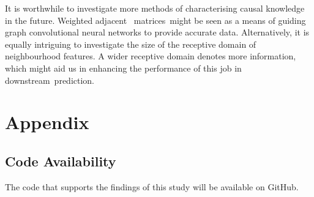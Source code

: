 \documentclass[sigconf,screen]{acmart}
\begin{document}
It is worthwhile to investigate more methods of characterising causal knowledge in the future. Weighted adjacent  matrices might be seen as a means of guiding graph convolutional neural networks to provide accurate data. Alternatively, it is equally intriguing to investigate the size of the receptive domain of neighbourhood features. A wider receptive domain denotes more information, which might aid us in enhancing the performance of this job in downstream prediction.




\appendix

\section{Appendix}

\subsection{Code Availability}
The code that supports the findings of this study will be available on GitHub. 
\end{document}

